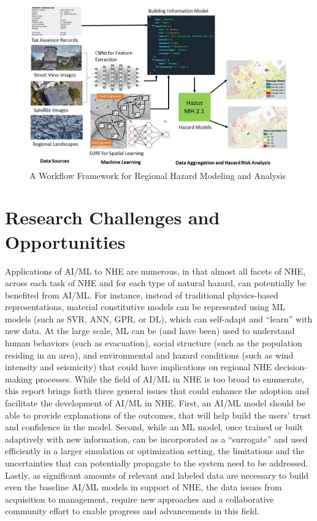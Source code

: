 \begin{figure}[htb]
    \centering
    \includegraphics[width=1.0\textwidth, angle = 0]{Figures/AI_workflow_for_regional_analysis.png}
    \caption{A Workflow Framework for Regional Hazard Modeling and Analysis}
    \label{fig:AI_workflow_for_regional_analysis}
\end{figure}

\section{Research Challenges and Opportunities}
\label{sec:ai_gaps}

Applications of AI/ML to NHE are numerous, in that almost all facets of NHE, across each task of NHE and for each type of natural hazard, can potentially be benefited from AI/ML. For instance, instead of traditional physics-based representations, material constitutive models can be represented using ML models (such as SVR, ANN, GPR, or DL), which can self-adapt and ``learn'' with new data. At the large scale, ML can be (and have been) used to understand human behaviors (such as evacuation), social structure (such as the population residing in an area), and environmental and hazard conditions (such as wind intensity and seismicity) that could have implications on regional NHE decision-making processes. While the field of AI/ML in NHE is too broad to enumerate, this report brings forth three general issues that could enhance the adoption and facilitate the development of AI/ML in NHE. First, an AI/ML model should be able to provide explanations of the outcomes, that will help build the users’ trust and confidence in the model. Second, while an ML model, once trained or built adaptively with new information, can be incorporated as a ``surrogate'' and used efficiently in a larger simulation or optimization setting, the limitations and the uncertainties that can potentially propagate to the system need to be addressed. Lastly, as significant amounts of relevant and labeled data are necessary to build even the baseline AI/ML models in support of NHE, the data issues from acquisition to management, require new approaches and a collaborative community effort to enable progress and advancements in this field. 

